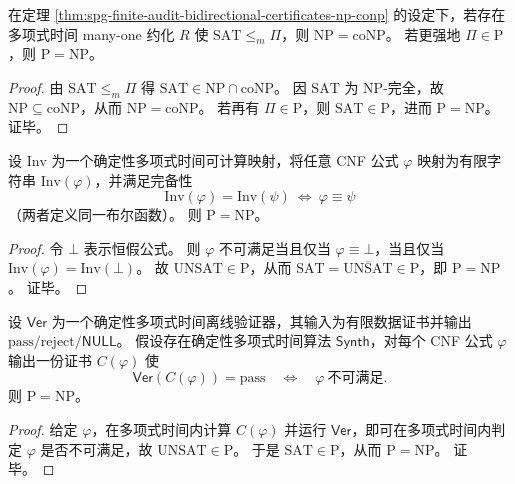 \begin{corollary}\label{cor:spg-finite-audit-np-complete-barrier}
在定理 \ref{thm:spg-finite-audit-bidirectional-certificates-np-conp} 的设定下，若存在多项式时间 many-one 约化 \(R\) 使 \(\mathrm{SAT}\le_m \Pi\)，则 \(\mathrm{NP}=\mathrm{coNP}\)。
若更强地 \(\Pi\in\mathrm{P}\)，则 \(\mathrm{P}=\mathrm{NP}\)。
\end{corollary}
\begin{proof}
由 \(\mathrm{SAT}\le_m\Pi\) 得 \(\mathrm{SAT}\in\mathrm{NP}\cap\mathrm{coNP}\)。
因 \(\mathrm{SAT}\) 为 \(\mathrm{NP}\)-完全，故 \(\mathrm{NP}\subseteq\mathrm{coNP}\)，从而 \(\mathrm{NP}=\mathrm{coNP}\)。
若再有 \(\Pi\in\mathrm{P}\)，则 \(\mathrm{SAT}\in\mathrm{P}\)，进而 \(\mathrm{P}=\mathrm{NP}\)。
证毕。
\end{proof}

\begin{theorem}[资源受限完备不变量屏障：多项式时间等价分类蕴含 \texorpdfstring{$\mathrm{P}=\mathrm{NP}$}{P=NP}]\label{thm:spg-polytime-complete-invariant-implies-p-equals-np}
设 \(\mathrm{Inv}\) 为一个确定性多项式时间可计算映射，将任意 CNF 公式 \(\varphi\) 映射为有限字符串 \(\mathrm{Inv}(\varphi)\)，并满足完备性
\[
\mathrm{Inv}(\varphi)=\mathrm{Inv}(\psi)\ \Longleftrightarrow\ \varphi\equiv\psi
\]
（两者定义同一布尔函数）。
则 \(\mathrm{P}=\mathrm{NP}\)。
\end{theorem}
\begin{proof}
令 \(\bot\) 表示恒假公式。
则 \(\varphi\) 不可满足当且仅当 \(\varphi\equiv\bot\)，当且仅当 \(\mathrm{Inv}(\varphi)=\mathrm{Inv}(\bot)\)。
故 \(\mathrm{UNSAT}\in\mathrm{P}\)，从而 \(\mathrm{SAT}=\overline{\mathrm{UNSAT}}\in\mathrm{P}\)，即 \(\mathrm{P}=\mathrm{NP}\)。
证毕。
\end{proof}

\begin{theorem}[可审计离线验证器的多项式证书合成蕴含 \texorpdfstring{$\mathrm{P}=\mathrm{NP}$}{P=NP}]\label{thm:spg-polytime-certificate-synthesis-implies-p-equals-np}
设 \(\mathsf{Ver}\) 为一个确定性多项式时间离线验证器，其输入为有限数据证书并输出 \(\mathrm{pass}/\mathrm{reject}/\mathsf{NULL}\)。
假设存在确定性多项式时间算法 \(\mathsf{Synth}\)，对每个 CNF 公式 \(\varphi\) 输出一份证书 \(C(\varphi)\) 使
\[
\mathsf{Ver}(C(\varphi))=\mathrm{pass}\quad\Longleftrightarrow\quad \varphi\ \text{不可满足}.
\]
则 \(\mathrm{P}=\mathrm{NP}\)。
\end{theorem}
\begin{proof}
给定 \(\varphi\)，在多项式时间内计算 \(C(\varphi)\) 并运行 \(\mathsf{Ver}\)，即可在多项式时间内判定 \(\varphi\) 是否不可满足，故 \(\mathrm{UNSAT}\in\mathrm{P}\)。
于是 \(\mathrm{SAT}\in\mathrm{P}\)，从而 \(\mathrm{P}=\mathrm{NP}\)。
证毕。
\end{proof}

